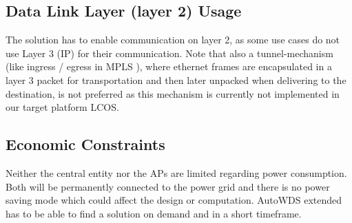     \subsection{Data Link Layer (layer 2) Usage}
      The solution has to enable communication on layer 2, as some use cases do not use Layer 3 (\ac{IP}) for their communication.
      Note that also a tunnel-mechanism (like ingress / egress in \ac{MPLS} \cite{mpls}), 
      where ethernet frames are encapsulated in a layer 3 packet for transportation and then later unpacked when delivering to the destination,
      is not preferred as this mechanism is currently not implemented in our target platform \ac{LCOS}.
    
    \subsection{Economic Constraints}
      Neither the central entity nor the APs are limited regarding power consumption. 
      Both will be permanently connected to the power grid and there is no power saving mode which could affect the design or computation.
      AutoWDS extended has to be able to find a solution on demand and in a short timeframe.
  
